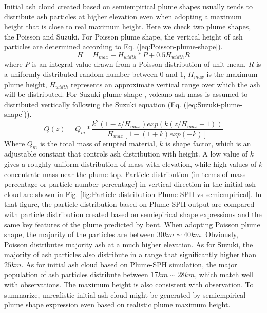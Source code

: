 Initial ash cloud created based on semiempirical plume shapes usually tends to distribute ash particles at higher elevation even when adopting a maximum height that is close to real maximum height. Here we check two plume shapes, the Poisson and Suzuki.
For Poisson plume shape, the vertical height of ash particles are determined according to Eq. (\ref{eq:Poisson-plume-shape}).
\begin{equation}
H=H_{max}-H_{width}*P+0.5 H_{width}R
\label{eq:Poisson-plume-shape}
\end{equation}
where $P$ is an integral value drawn from a Poisson
distribution of unit mean, $R$ is a uniformly distributed random number between 0 and 1, $H_{max}$ is the maximum plume height, $H_{width}$ represents an approximate vertical range over which the ash will be
distributed.
For Suzuki plume shape \citep{suzuki1983theoretical}, volcano ash mass is assumed to distributed vertically following the Suzuki equation (Eq. (\ref{eq:Suzuki-plume-shape})).
\begin{equation}
Q(z)=Q_m* \frac{k^2(1-z/H_{max})exp\left(k(z/H_{max} -1 )\right)}{H_{max}\left[1-(1+k)exp(-k)\right]}
\label{eq:Suzuki-plume-shape}
\end{equation}
Where $Q_m$ is the total mass of erupted material, $k$ is shape factor, which is an adjustable constant that controls ash distribution with height. A low value of $k$ gives a roughly uniform distribution of mass with elevation, while high values of $k$ concentrate mass near the plume top.
Particle distribution (in terms of mass percentage or particle number percentage) in vertical direction in the initial ash cloud are shown in Fig. \ref{fig:Particle-distribution-Plume-SPH-vs-semiempirical}. In that figure, the particle distribution based on Plume-SPH output are compared with particle distribution created based on semiepirical shape expressions and the same key features of the plume predicted by bent. When adopting Poisson plume shape, the majority of the particles are between $30 km \sim 40 km$. Obviously, Poisson distributes majority ash at a much higher elevation. As for Suzuki, the majority of ash particles also distribute in a range that significantly higher than $25 km$. As for initial ash cloud based on Plume-SPH simulation, the major population of ash particles distribute between $17 km \sim 28 km$, which match well with observations. The maximum height is also consistent with observation. To summarize, unrealistic initial ash cloud might be generated by semiempirical plume shape expression even based on realistic plume maximum height.

